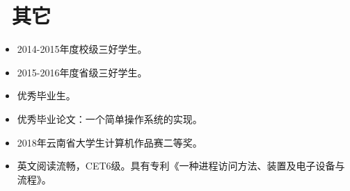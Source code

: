 \documentclass{resume}
\begin{document}



\section{\faInfo\ 其它}
\begin{itemize}[parsep=0.5ex]
  \item 2014-2015年度校级三好学生。
  \item 2015-2016年度省级三好学生。
  \item 优秀毕业生。
  \item 优秀毕业论文：一个简单操作系统的实现。
  \item 2018年云南省大学生计算机作品赛二等奖。
  \item 英文阅读流畅，CET6级。具有专利《一种进程访问方法、装置及电子设备与流程》。
\end{itemize}

%
%
\end{document}
